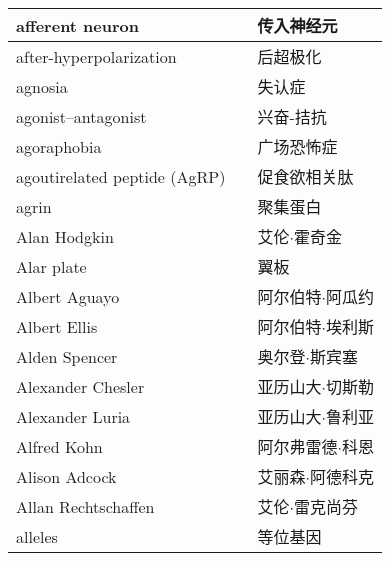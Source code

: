 \begin{longtable}{lll}
	\midrule
	afferent neuron     &&  传入神经元  \\
	
	\midrule
	after-hyperpolarization     &&  后超极化  \\
	
	\midrule
	agnosia     &&  失认症  \\
	
	\midrule
	agonist–antagonist     &&  兴奋-拮抗  \\
	
	\midrule
	agoraphobia     &&  广场恐怖症  \\
	
	\midrule
	agoutirelated peptide (AgRP)    &&  促食欲相关肽  \\
	
	\midrule
	agrin     &&  聚集蛋白  \\
	
	\midrule
	Alan Hodgkin    &&  艾伦$\cdot$霍奇金  \\
	
	\midrule
	Alar plate     &&  翼板  \\
	
	\midrule
	Albert Aguayo     &&  阿尔伯特$\cdot$阿瓜约  \\
	
	\midrule
	Albert Ellis     &&  阿尔伯特$\cdot$埃利斯  \\
	
	\midrule
	Alden Spencer     &&  奥尔登$\cdot$斯宾塞  \\
	
	\midrule
	Alexander Chesler     &&  亚历山大$\cdot$切斯勒  \\
	
	\midrule
	Alexander Luria     &&  亚历山大$\cdot$鲁利亚  \\
	
	\midrule
	Alfred Kohn     &&  阿尔弗雷德$\cdot$科恩  \\
	
	\midrule
	Alison Adcock     &&  艾丽森$\cdot$阿德科克  \\
	
	\midrule
	Allan Rechtschaffen     &&  艾伦$\cdot$雷克尚芬  \\
	
	\midrule
	alleles     &&  等位基因  \\
	

\end{longtable}
